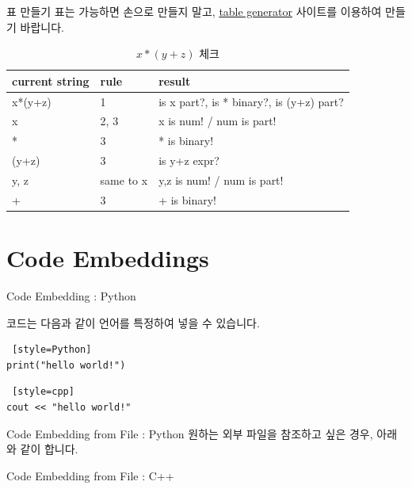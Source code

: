 \documentclass{beamer}
\newenvironment{slide}[1][]
{%
  \begin{frame}[allowframebreaks,#1]%
  }{%
  \end{frame}%
}
\newcommand{\includecode}[3]{} %
\newcommand{\python}[2]{} %
\newcommand{\cpp}[2]{} %
\begin{document}
\begin{slide}[fragile, environment=slide]{표 만들기}
표는 가능하면 손으로 만들지 말고, \href{https://www.tablesgenerator.com/}{table generator} 사이트를 이용하여 만들기 바랍니다. 

\begin{table}[]
\centering
\caption{$x*(y+z)$ 체크}
\label{my-label}
\begin{tabular}{|l|l|l|}
\hline
current string & rule & result \\ \hline
x*(y+z)&1    & is x part?, is * binary?, is (y+z) part?      \\ \hline
x &  2, 3 & x is num! / num is part!      \\ \hline
*& 3    & * is binary!      \\ \hline
(y+z)& 3    &  is y+z expr?      \\ \hline
y, z& same to x    &   y,z is num! / num is part!   \\ \hline
+ & 3    &  + is binary!     \\ \hline
\end{tabular}
\end{table}

\end{slide} 

\section{Code Embeddings}

\begin{slide}[fragile, environment=slide]{Code Embedding : Python} 

코드는 다음과 같이 언어를 특정하여 넣을 수 있습니다. 

\begin{lstlisting} [style=Python]
print("hello world!")
\end{lstlisting}

\begin{lstlisting} [style=cpp]
cout << "hello world!"
\end{lstlisting}
\end{slide}


\begin{slide}[fragile, environment=slide]{Code Embedding from File : Python} 
원하는 외부 파일을 참조하고 싶은 경우, 아래와 같이 합니다. 
\python{hello.py}{hello world!}
\framebreak
\includecode{python}{hello.py}{hello world!}
\end{slide}

\begin{slide}[fragile, environment=slide]{Code Embedding from File : C++} 
\cpp{hello.cpp}{hello world!}
\framebreak
\includecode{cpp}{hello.cpp}{hello world!}
\end{slide}
\end{document}
